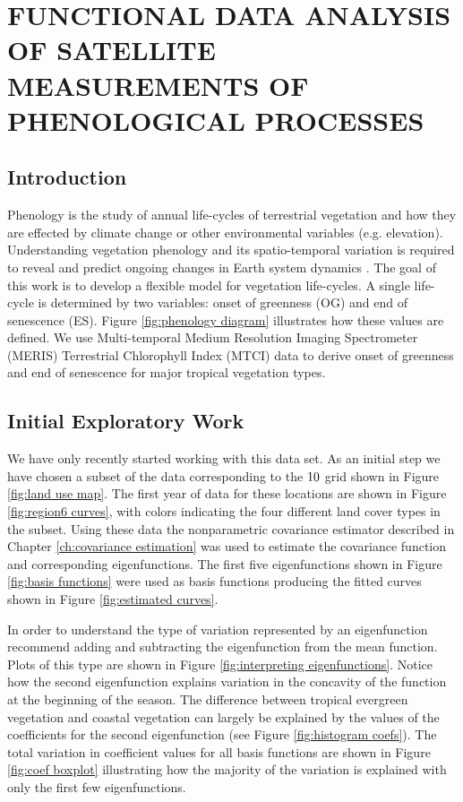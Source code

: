 
\section{FUNCTIONAL DATA ANALYSIS OF SATELLITE MEASUREMENTS OF PHENOLOGICAL PROCESSES}
\label{future work}



\subsection{Introduction}

Phenology is the study of annual life-cycles of terrestrial vegetation and how they are effected by climate change or other environmental variables (e.g. elevation). 
Understanding vegetation phenology and its spatio-temporal variation is required to reveal and predict ongoing changes in Earth system dynamics  \cite{Jeganathan:2010:0921-2973:1125}. The goal of this work is to develop a flexible model for vegetation life-cycles.  A single life-cycle is determined by two variables: onset of greenness (OG) and end of senescence (ES). Figure \ref{fig:phenology diagram} illustrates how these values are defined. We use Multi-temporal Medium Resolution Imaging Spectrometer (MERIS) Terrestrial Chlorophyll Index (MTCI) data to derive onset of greenness and end of senescence for major tropical vegetation types.

\subsection{Initial Exploratory Work}
We have only recently started working with this data set. As an initial step we have chosen a subset of the data corresponding to the $10\time 10$ grid shown in Figure \ref{fig:land use map}. The first year of data for these locations are shown in Figure \ref{fig:region6 curves}, with colors indicating the four different land cover types in the subset. Using these data the nonparametric covariance estimator described in Chapter \ref{ch:covariance estimation} was used to estimate the covariance function and corresponding eigenfunctions. The first five eigenfunctions shown in Figure \ref{fig:basis functions} were used as basis functions producing the fitted curves shown in Figure \ref{fig:estimated curves}. 

In order to understand the type of variation represented by an eigenfunction \cite{FDA} recommend adding and subtracting the eigenfunction from the mean function. Plots of this type are shown in Figure \ref{fig:interpreting eigenfunctions}. Notice how the second eigenfunction explains variation in the concavity of the function at the beginning of the season. The difference between tropical evergreen vegetation and coastal vegetation can largely be explained by the values of the coefficients for the second eigenfunction (see Figure \ref{fig:histogram coefs}). The total variation in coefficient values for all basis functions are shown in Figure \ref{fig:coef boxplot} illustrating how the majority of the variation is explained with only the first few eigenfunctions. 


